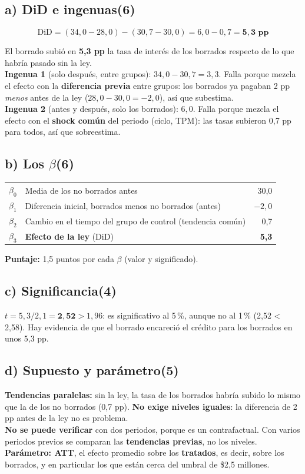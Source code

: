 \documentclass[11pt,a4paper]{article}
\newcommand{\sub}[2]{\subsection*{#1\hfill{\normalsize\textbf{(#2)}}}}
\begin{document}
\sub{a) DiD e ingenuas}{6}
\[
\text{DiD}=(34{,}0-28{,}0)-(30{,}7-30{,}0)=6{,}0-0{,}7=\mathbf{5{,}3\text{ pp}}
\]
\begin{ejemplar}
El borrado subió en \textbf{5,3 pp} la tasa de interés de los borrados respecto de lo que habría pasado sin la ley.\\
\textbf{Ingenua 1} (solo después, entre grupos): $34{,}0-30{,}7=3{,}3$. Falla porque mezcla el efecto con la \textbf{diferencia previa} entre grupos: los borrados ya pagaban 2 pp \emph{menos} antes de la ley ($28{,}0-30{,}0=-2{,}0$), así que subestima.\\
\textbf{Ingenua 2} (antes y después, solo los borrados): $6{,}0$. Falla porque mezcla el efecto con el \textbf{shock común} del periodo (ciclo, TPM): las tasas subieron 0,7 pp para todos, así que sobreestima.
\end{ejemplar}

\sub{b) Los $\beta$}{6}
\begin{center}\small
\renewcommand{\arraystretch}{1.2}
\begin{tabular}{llr}\toprule
$\beta_0$ & Media de los no borrados antes & 30,0\\
$\beta_1$ & Diferencia inicial, borrados menos no borrados (antes) & $-2{,}0$\\
$\beta_2$ & Cambio en el tiempo del grupo de control (tendencia común) & 0,7\\
$\beta_3$ & \textbf{Efecto de la ley} (DiD) & \textbf{5,3}\\\bottomrule
\end{tabular}
\end{center}
\textbf{Puntaje:} 1,5 puntos por cada $\beta$ (valor y significado).

\sub{c) Significancia}{4}
\begin{ejemplar}
$t=5{,}3/2{,}1=\mathbf{2{,}52}>1{,}96$: es significativo al 5\,\%, aunque no al 1\,\% (2,52 < 2,58). Hay evidencia de que el borrado encareció el crédito para los borrados en unos 5,3 pp.
\end{ejemplar}

\sub{d) Supuesto y parámetro}{5}
\begin{ejemplar}
\textbf{Tendencias paralelas:} sin la ley, la tasa de los borrados habría subido lo mismo que la de los no borrados (0,7 pp). \textbf{No exige niveles iguales}: la diferencia de 2 pp antes de la ley no es problema.\\
\textbf{No se puede verificar} con dos periodos, porque es un contrafactual. Con varios periodos previos se comparan las \textbf{tendencias previas}, no los niveles.\\
\textbf{Parámetro: ATT}, el efecto promedio sobre los \textbf{tratados}, es decir, sobre los borrados, y en particular los que están cerca del umbral de \$2,5 millones.
\end{ejemplar}
\end{document}
